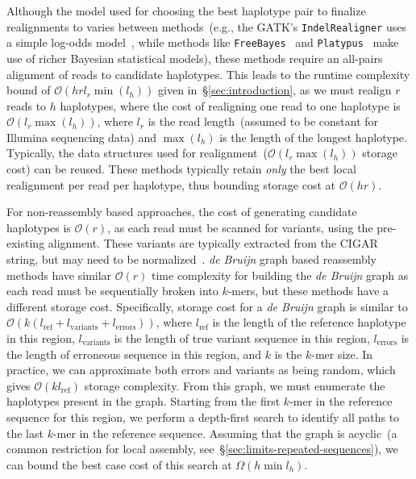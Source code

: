 \documentclass[11pt]{article}
\begin{document}
Although the model used for choosing the best haplotype pair to finalize realignments to varies between
methods~(e.g., the GATK's \texttt{IndelRealigner} uses a simple log-odds model~\cite{depristo11}, while
methods like \texttt{FreeBayes}~\cite{garrison12} and \texttt{Platypus}~\cite{rimmer14} make use of richer
Bayesian statistical models), these methods require an all-pairs alignment of reads to candidate
haplotypes. This leads to the runtime complexity bound of $\mathcal{O}(h r l_r \min(l_h))$ given
in~\S\ref{sec:introduction}, as we must realign $r$ reads to $h$ haplotypes, where the cost of realigning
one read to one haplotype is $\mathcal{O}(l_r \max(l_h))$, where $l_r$ is the read length~(assumed to be
constant for Illumina sequencing data) and $\max(l_h)$ is the length of the longest haplotype. Typically,
the data structures used for realignment~($\mathcal{O}(l_r \max(l_h))$ storage cost) can be reused.
These methods typically retain \emph{only} the best local realignment per read per haplotype, thus
bounding storage cost at $\mathcal{O}(h r)$.

For non-reassembly based approaches, the cost of generating candidate haplotypes is $\mathcal{O}(r)$,
as each read must be scanned for variants, using the pre-existing alignment. These variants are typically
extracted from the CIGAR string, but may need to be normalized~\cite{li14}. \emph{de Bruijn} graph based 
reassembly methods have similar $\mathcal{O}(r)$ time complexity for building the \emph{de Bruijn}
graph as each read must be sequentially broken into $k$-mers, but these methods have a different
storage cost. Specifically, storage cost for a \emph{de Bruijn} graph is similar to $\mathcal{O}(k
(l_{\text{ref}} + l_{\text{variants}} + l_{\text{errors}}))$, where $l_{\text{ref}}$ is the length of the reference
haplotype in this region, $l_{\text{variants}}$ is the length of true variant sequence in this region, 
$l_{\text{errors}}$ is the length of erroneous sequence in this region, and $k$ is the $k$-mer size. In
practice, we can approximate both errors and variants as being random, which gives $\mathcal{O}(k
l_{\text{ref}})$ storage complexity. From this graph, we must enumerate the haplotypes present in the
graph. Starting from the first $k$-mer in the reference sequence for this region, we perform a depth-first
search to identify all paths to the last $k$-mer in the reference sequence. Assuming that the graph is
acyclic~(a common restriction for local assembly, see~\S\ref{sec:limits-repeated-sequences}), we can
bound the best case cost of this search at $\Omega(h \min l_h)$.
\end{document}
